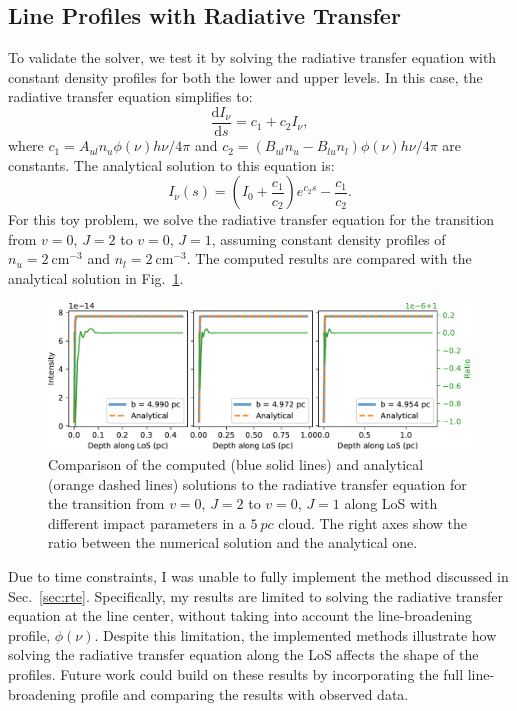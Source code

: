 \documentclass[12pt,a4paper]{article}
\newcommand{\fird}[2][]{\frac{\mathrm{d}#1}{\mathrm{d}#2}}
\begin{document}
\subsection{Line Profiles with Radiative Transfer} \label{sec:comprte}

To validate the solver, we test it by solving the radiative transfer equation with constant density profiles for both the lower and upper levels. In this case, the radiative transfer equation simplifies to:
\begin{equation}
    \fird[I_\nu]{s} = c_1  + c_2 I_\nu, \label{eq:simple_rte}
\end{equation} 
where $c_1 = A_{ul} n_u \phi(\nu) h\nu/4\pi$ and $c_2 = (B_{ul} n_u - B_{lu} n_l) \phi(\nu) h\nu/4\pi$ are constants. The analytical solution to this equation is:
\begin{equation}
    I_\nu (s) = (I_0 + \frac{c_1}{c_2})e^{c_2s} - \frac{c_1}{c_2}.
\end{equation}
For this toy problem, we solve the radiative transfer equation for the  transition from  \(v = 0\), \(J = 2\) to \(v = 0\), \(J = 1\), assuming constant density profiles of $n_u = \qty{2}{\cm^{-3}}$ and $n_l = \qty{2}{\cm^{-3}}$. The computed results are compared with the analytical solution in Fig.~\ref{fig:rtecstn}.

\begin{figure}[h]
    \centering
    \includegraphics[width=\textwidth,keepaspectratio]{rte_constant_density.pdf}
    \caption{Comparison of the computed (blue solid lines) and analytical (orange dashed lines) solutions to the radiative transfer equation for the  transition from \(v = 0\), \(J = 2\) to \(v = 0\), \(J = 1\) along LoS with different impact parameters in a \(\qty{5}{pc}\) cloud. The right axes show the ratio between the numerical solution and the analytical one.} \label{fig:rtecstn}
\end{figure}

Due to time constraints, I was unable to fully implement the method discussed in Sec.~\ref{sec:rte}. Specifically, my results are limited to solving the radiative transfer equation at the line center, without taking into account the line-broadening profile, $\phi(\nu)$. Despite this limitation, the implemented methods illustrate how solving the radiative transfer equation along the LoS affects the shape of the profiles. Future work could build on these results by incorporating the full line-broadening profile and comparing the results with observed data.
\end{document}
